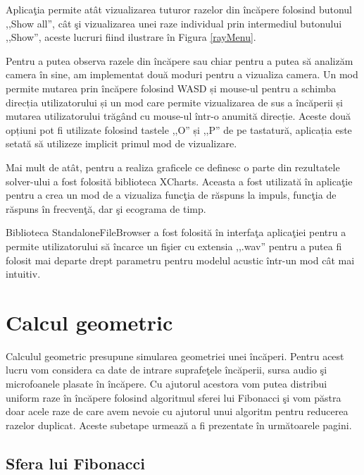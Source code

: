 	Aplica\c{t}ia permite at\^{a}t vizualizarea tuturor razelor din \^{i}nc\u{a}pere folosind butonul ,,Show all'', c\^{a}t \c{s}i vizualizarea unei raze individual prin intermediul butonului ,,Show'', aceste lucruri fiind ilustrare \^{i}n Figura \ref{rayMenu}.
	
	Pentru a putea observa razele din încăpere sau chiar pentru a putea să analizăm camera în sine, am implementat două moduri pentru a vizualiza camera. Un mod permite mutarea prin încăpere folosind WASD și mouse-ul pentru a schimba direcția utilizatorului și un mod care permite vizualizarea de sus a încăperii și mutarea utilizatorului trăgând cu mouse-ul într-o anumită direcție. Aceste două opțiuni pot fi utilizate folosind tastele ,,O'' și ,,P'' de pe tastatură, aplicația este setată să utilizeze implicit primul mod de vizualizare.
	 
	Mai mult de at\^{a}t, pentru a realiza graficele ce definesc o parte din rezultatele solver-ului a fost folosit\u{a} biblioteca XCharts. Aceasta a fost utilizată \^{i}n aplica\c{t}ie pentru a crea un mod de a vizualiza func\c{t}ia de r\u{a}spuns la impuls, func\c{t}ia de r\u{a}spuns \^{i}n frecven\c{t}\u{a}, dar \c{s}i ecograma de timp.
	
	
	Biblioteca StandaloneFileBrowser a fost folosit\u{a} \^{i}n interfa\c{t}a aplica\c{t}iei pentru a permite utilizatorului s\u{a} \^{i}ncarce un fi\c{s}ier cu extensia ,,.wav'' pentru a putea fi folosit mai departe drept parametru pentru modelul acustic \^{i}ntr-un mod c\^{a}t mai intuitiv.


\section{Calcul geometric}

	Calculul geometric presupune simularea geometriei unei \^{i}nc\u{a}peri. Pentru acest lucru vom considera ca date de intrare suprafe\c{t}ele \^{i}nc\u{a}perii, sursa audio \c{s}i microfoanele plasate \^{i}n \^{i}nc\u{a}pere. Cu ajutorul acestora vom putea distribui uniform raze \^{i}n \^{i}nc\u{a}pere folosind algoritmul sferei lui Fibonacci \c{s}i vom p\u{a}stra doar acele raze de care avem nevoie cu ajutorul unui algoritm pentru reducerea razelor duplicat. Aceste subetape urmeaz\u{a} a fi prezentate \^{i}n urm\u{a}toarele pagini.
	
\subsection{Sfera lui Fibonacci}

